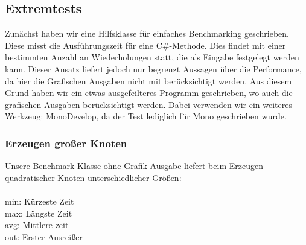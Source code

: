 %



\newpage



\label{Abschnitt:Tests:Protokoll:Extrem}



\subsection*{Extremtests}

Zunächst haben wir eine Hilfsklasse für einfaches Benchmarking geschrieben. Diese misst die Ausführungszeit für eine C\#-Methode. Dies findet mit einer bestimmten Anzahl an Wiederholungen statt, die als Eingabe festgelegt werden kann. Dieser Ansatz liefert jedoch nur begrenzt Aussagen über die Performance, da hier die Grafischen Ausgaben nicht mit berücksichtigt werden. Aus diesem Grund haben wir ein etwas ausgefeilteres Programm geschrieben, wo auch die grafischen Ausgaben berücksichtigt werden. Dabei verwenden wir ein weiteres Werkzeug: MonoDevelop, da der Test lediglich für Mono geschrieben wurde.\\


\label{Abschnitt:Tests:Protokoll:Extrem:Knoten_Erzeugen}

\subsubsection*{Erzeugen großer Knoten}

Unsere Benchmark-Klasse ohne Grafik-Ausgabe liefert beim Erzeugen quadratischer Knoten unterschiedlicher Größen:\\~\\

min: Kürzeste Zeit\\
max: Längste Zeit\\
avg: Mittlere zeit\\
out: Erster Ausreißer\\

~\\

